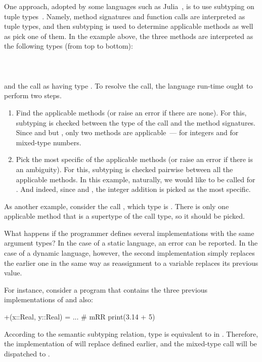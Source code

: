 One approach, adopted by some languages
such as Julia~\cite{Bezanson2015AbstractionIT}, 
is to use subtyping on tuple types~\cite{bib:Leavens:1998:mddtuples}.
Namely, method signatures and function calls are interpreted as tuple types,
and then subtyping is used to determine applicable methods 
as well as pick one of them.
In the example above, the three methods are interpreted 
as the following types (from top to bottom):\\
\\
\\
\\
and the call as having type .
To resolve the call, the language run-time ought to perform two steps.
\begin{enumerate}
  \item Find the applicable methods (or raise an error if there are none). 
    For this, subtyping is checked between
    the type of the call  and the method signatures.
    Since  and  but
    , only two methods are applicable~---
     for integers and  for mixed-type numbers.
  \item Pick the most specific of the applicable methods
    (or raise an error if there is an ambiguity).
    For this, subtyping is checked pairwise between all the applicable methods.
    In this example, naturally, we would like  to be called
    for . And indeed, since 
    and ,
    the integer addition is picked as the most specific.
\end{enumerate}
As another example, consider the call , which type is
. There is only one applicable method 
that is a supertype of the call type, so it should be picked.

What happens if the programmer defines
several implementations with the same argument types? 
In the case of a static language, an error can be reported.
In the case of a dynamic language, however, the second implementation
simply replaces the earlier one in the same way as reassignment
to a variable replaces its previous value.

For instance, consider a program 
that contains the three previous implementations of \jlcode{(+)} %
and also: %
\begin{lstminijl}
+(x::Real, y::Real) = ...   # mRR
print(3.14 + 5)	 
\end{lstminijl}
According to the semantic subtyping relation, type  is equivalent
to  in \BetaJulia. 
Therefore, the implementation of  will replace 
 defined earlier, 
and the mixed-type call  will be dispatched to .

